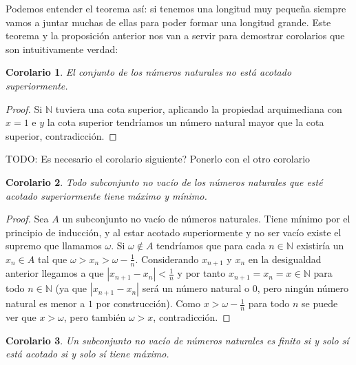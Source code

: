 \documentclass{article}
\newtheorem{cor}{Corolario}
\newcommand{\naturales}{\mathbb{N}}
\begin{document}
Podemos entender el teorema así: si tenemos una longitud muy pequeña siempre vamos a juntar muchas de ellas para poder formar una longitud grande. Este teorema y la proposición anterior nos van a servir para demostrar corolarios que son intuitivamente verdad:
\begin{cor}
	El conjunto de los números naturales no está acotado superiormente.
\end{cor}
\begin{proof}
	Si $\naturales$ tuviera una cota superior, aplicando la propiedad arquimediana con $x=1$ e $y$ la cota superior tendríamos un número natural mayor que la cota superior, contradicción.
\end{proof}
TODO: Es necesario el corolario siguiente? Ponerlo con el otro corolario
\begin{cor}
	Todo subconjunto no vacío de los números naturales que esté acotado superiormente tiene máximo y mínimo.
\end{cor}
\begin{proof}
	Sea $A$ un subconjunto no vacío de números naturales. Tiene mínimo por el principio de inducción, y al estar acotado superiormente y no ser vacío existe el supremo que llamamos $\omega$. Si $\omega \not \in A$ tendríamos que para cada $n \in \naturales$ existiría un $x_n \in A$ tal que $\omega > x_n > \omega - \frac{1}{n}$. Considerando $x_{n+1}$ y $x_n$ en la desigualdad anterior llegamos a que $|x_{n+1} - x_n| < \frac{1}{n}$ y por tanto $x_{n+1} = x_n = x \in \naturales$ para todo $n \in \naturales$ (ya que $|x_{n+1} - x_n|$ será un número natural o $0$, pero ningún número natural es menor a $1$ por construcción). Como $x > \omega - \frac{1}{n}$ para todo $n$ se puede ver que $x > \omega$, pero también $\omega > x$, contradicción.
\end{proof}
\begin{cor}
	Un subconjunto no vacío de números naturales es finito si y solo sí está acotado si y solo sí tiene máximo.
\end{cor}
\end{document}
